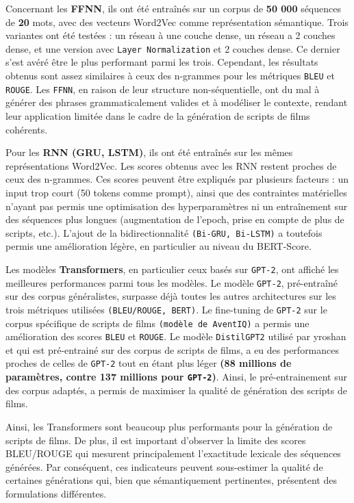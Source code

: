 \documentclass[12pt]{report}
\begin{document}
Concernant les \textbf{FFNN}, ils ont été entraînés sur un corpus de \textbf{50 000} séquences de \textbf{20} mots, avec des vecteurs Word2Vec comme représentation sémantique. Trois variantes ont été testées : un réseau à une couche dense, un réseau a 2 couches dense, et une version avec \texttt{Layer Normalization} et 2 couches dense. Ce dernier s’est avéré être le plus performant parmi les trois. Cependant, les résultats obtenus sont assez similaires à ceux des n-grammes pour les métriques \texttt{BLEU} et \texttt{ROUGE}. Les \texttt{FFNN}, en raison de leur structure non-séquentielle, ont du mal à générer des phrases grammaticalement valides et à modéliser le contexte, rendant leur application limitée dans le cadre de la génération de scripts de films cohérents. 

Pour les \textbf{RNN (GRU, LSTM)}, ils ont été entraînés sur les mêmes représentations Word2Vec. Les scores obtenus avec les RNN restent proches de ceux des n-grammes. Ces scores peuvent être expliqués par plusieurs facteurs : un input trop court (50 tokens comme prompt), ainsi que des contraintes matérielles n’ayant pas permis une optimisation des hyperparamètres ni un entraînement sur des séquences plus longues (augmentation de l’epoch, prise en compte de plus de scripts, etc.). L’ajout de la bidirectionnalité \texttt{(Bi-GRU, Bi-LSTM)} a toutefois permis une amélioration légère, en particulier au niveau du BERT-Score. 

Les modèles \textbf{Transformers}, en particulier ceux basés sur \texttt{GPT-2}, ont affiché les meilleures performances parmi tous les modèles. Le modèle \texttt{GPT-2}, pré-entraîné sur des corpus généralistes, surpasse déjà toutes les autres architectures sur les trois métriques utilisées \texttt{(BLEU/ROUGE, BERT)}. Le fine-tuning de \texttt{GPT-2} sur le corpus spécifique de scripts de films \texttt{(modèle de AventIQ)} a permis une amélioration des scores \texttt{BLEU} et \texttt{ROUGE}. Le modèle \texttt{DistilGPT2} utilisé par yroshan et qui est pré-entrainé sur des corpus de scripts de films, a eu des performances proches de celles de \texttt{GPT-2} tout en étant plus léger \textbf{(88 millions de paramètres, contre 137 millions pour \texttt{GPT-2})}. Ainsi, le pré-entrainement sur des corpus adaptés, a permis de maximiser la qualité de génération des scripts de films. 

Ainsi, les Transformers sont beaucoup plus performants pour la génération de scripts de films. De plus, il est important d’observer la limite des scores BLEU/ROUGE qui mesurent principalement l’exactitude lexicale des séquences générées. Par conséquent, ces indicateurs peuvent sous-estimer la qualité de certaines générations qui, bien que sémantiquement pertinentes, présentent des formulations différentes. 
\end{document}
